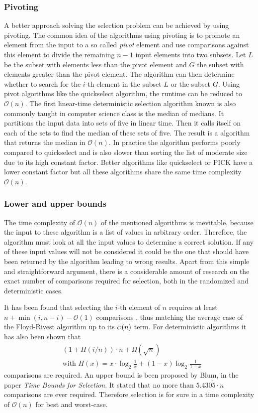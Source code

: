\documentclass[10pt,journal,compsoc]{IEEEtran}
\newcommand\smallO{
  \mathchoice
    {{\scriptstyle\mathcal{O}}}%
    {{\scriptstyle\mathcal{O}}}%
    {{\scriptscriptstyle\mathcal{O}}}%
    {\scalebox{.50}{$\scriptscriptstyle\mathcal{O}$}}%
  }
\begin{document}
\subsubsection{Pivoting}
A better approach solving the selection problem can be achieved by using
pivoting. The common idea of the algorithms using pivoting is to promote an
element from the input to a so called \textit{pivot} element and use comparisons
against this element to divide the remaining $n - 1$ input elements into two
subsets. Let $L$ be the subset with elements less than the pivot element and $G$
the subset with elements greater than the pivot element. The algorithm can then
determine whether to search for the $i$-th element in the subset $L$ or the
subset $G$. Using pivot algorithms like the quickselect algorithm, the runtime
can be reduced to $\mathcal{O}(n)$.
The first linear-time deterministic selection algorithm known is also commonly
taught in computer science class is the median of medians. It partitions the
input data into sets of five in linear time. Then it calls itself on each of the
sets to find the median of these sets of five. The result is a algorithm that
returns the median in $\mathcal{O}(n)$. In practice the algorithm performs
poorly compared to quickselect and is also slower than sorting the list of
moderate size due to its high constant factor. Better algorithms like
quickselect or PICK have a lower constant factor but all these algorithms share
the same time complexity $\mathcal{O}(n)$. \cite{Blum1972, HoareQuickselect}

\subsubsection{Lower and upper bounds}
The time complexity of $\mathcal{O}(n)$ of the mentioned algorithms is
inevitable, because the input to these algorithm is a list of values in
arbitrary order. Therefore, the algorithm must look at all the input values to
determine a correct solution. If any of these input values will not be
considered it could be the one that should have been returned by the algorithm
leading to wrong results. Apart from this simple and straightforward argument,
there is a considerable amount of research on the exact number of comparisons
required for selection, both in the randomized and deterministic cases.

It has been found that selecting the $i$-th element of $n$ requires at least
$n+\min(i,n-i)-\mathcal{O}(1)$ comparisons \cite{cunto1989}, thus matching the
average case of the Floyd-Rivest algorithm up to its $\smallO(n)$ term. For
deterministic algorithms it has also been shown that
\begin{eqnarray*}
  &\left (1 + H(i/n) \right ) \cdot n + \Omega(\sqrt n) \\
  &\text{with~} H(x) = x \cdot \log_2 \frac{1}{x} + (1-x) \log_2 \frac{1}{1-x}
\end{eqnarray*}
comparisons are required. An upper bound is been proposed by Blum, in the paper
\textit{Time Bounds for Selection}. \cite{Blum1972} It stated that no more than
$5.430\dot{5} \cdot n$ comparisons are ever required. \cite{Blum1972} Therefore
selection is for sure in a time complexity of $\mathcal{O}(n)$ for best and
worst-case.
\end{document}
